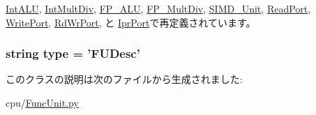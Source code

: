 \hyperlink{classFuncUnitConfig_1_1IntALU_a31b2f9e3ac9a504397b140f513c469cc}{IntALU}, \hyperlink{classFuncUnitConfig_1_1IntMultDiv_a31b2f9e3ac9a504397b140f513c469cc}{IntMultDiv}, \hyperlink{classFuncUnitConfig_1_1FP__ALU_a31b2f9e3ac9a504397b140f513c469cc}{FP\_\-ALU}, \hyperlink{classFuncUnitConfig_1_1FP__MultDiv_a31b2f9e3ac9a504397b140f513c469cc}{FP\_\-MultDiv}, \hyperlink{classFuncUnitConfig_1_1SIMD__Unit_a31b2f9e3ac9a504397b140f513c469cc}{SIMD\_\-Unit}, \hyperlink{classFuncUnitConfig_1_1ReadPort_a31b2f9e3ac9a504397b140f513c469cc}{ReadPort}, \hyperlink{classFuncUnitConfig_1_1WritePort_a31b2f9e3ac9a504397b140f513c469cc}{WritePort}, \hyperlink{classFuncUnitConfig_1_1RdWrPort_a31b2f9e3ac9a504397b140f513c469cc}{RdWrPort}, と \hyperlink{classFuncUnitConfig_1_1IprPort_a31b2f9e3ac9a504397b140f513c469cc}{IprPort}で再定義されています。\hypertarget{classFuncUnit_1_1FUDesc_acce15679d830831b0bbe8ebc2a60b2ca}{
\subsubsection[{type}]{\setlength{\rightskip}{0pt plus 5cm}string {\bf type} = '{\bf FUDesc}'}}
\label{classFuncUnit_1_1FUDesc_acce15679d830831b0bbe8ebc2a60b2ca}


このクラスの説明は次のファイルから生成されました:\begin{DoxyCompactItemize}
\item 
cpu/\hyperlink{FuncUnit_8py}{FuncUnit.py}\end{DoxyCompactItemize}
